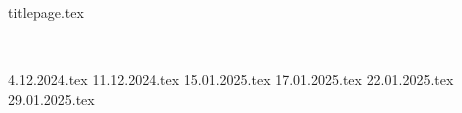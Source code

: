 \documentclass[10pt, twoside]{article}
\begin{document}
\thispagestyle{empty}
{titlepage.tex}

\newpage \thispagestyle{empty}\ \newpage

\setcounter{page}{0}
\thispagestyle{empty}
\tableofcontents\pagebreak

{4.12.2024.tex}
{11.12.2024.tex}
{15.01.2025.tex}
{17.01.2025.tex}
{22.01.2025.tex}
{29.01.2025.tex}
\end{document}
